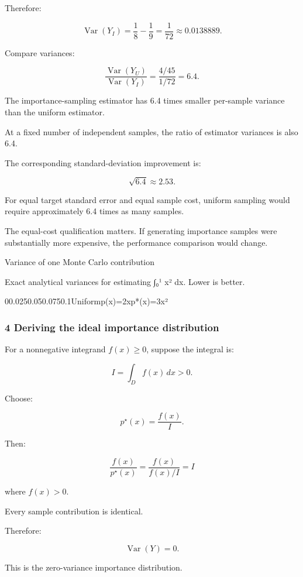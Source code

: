 Therefore:

\[
 \operatorname{Var}(Y_I) = \frac18-\frac19 = \boxed{\frac1{72}} \approx0.0138889.
\]

Compare variances:

\[
 \boxed{ \frac{\operatorname{Var}(Y_U)} {\operatorname{Var}(Y_I)} = \frac{4/45}{1/72} =6.4 }.
\]

The importance-sampling estimator has 6.4 times smaller per-sample variance than the uniform estimator.

At a fixed number of independent samples, the ratio of estimator variances is also 6.4.

The corresponding standard-deviation improvement is:

\[
 \sqrt{6.4}\approx2.53.
\]

For equal target standard error and equal sample cost, uniform sampling would require approximately 6.4 times as many samples.

The equal-cost qualification matters. If generating importance samples were substantially more expensive, the performance comparison would change.

Variance of one Monte Carlo contribution

Exact analytical variances for estimating ∫₀¹ x² dx. Lower is better.

00.0250.050.0750.1Uniformp(x)=2xp*(x)=3x²

\subsubsection{4 Deriving the ideal importance distribution}\label{02-foundations-ii-ch029-deriving-the-ideal-importance-distribution}

For a nonnegative integrand \(f(x)\ge0\), suppose the integral is:

\[
 I=\int_Df(x)\,dx>0.
\]

Choose:

\[
 \boxed{ p^\star(x)=\frac{f(x)}I }.
\]

Then:

\[
 \frac{f(x)}{p^\star(x)} = \frac{f(x)}{f(x)/I} =I
\]

where \(f(x)>0\).

Every sample contribution is identical.

Therefore:

\[
 \boxed{ \operatorname{Var}(Y)=0 }.
\]

This is the zero-variance importance distribution.

